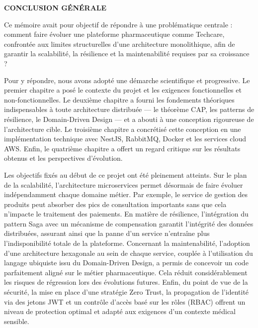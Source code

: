 \thispagestyle{normalpage}

\begin{center}
    \large \textbf{CONCLUSION GÉNÉRALE}
\end{center}
\label{page:conclusion}

\vspace{0.5cm}

Ce mémoire avait pour objectif de répondre à une problématique centrale : comment faire évoluer une plateforme pharmaceutique comme Techcare, confrontée aux limites structurelles d'une architecture monolithique, afin de garantir la scalabilité, la résilience et la maintenabilité requises par sa croissance ?

\vspace{0.3cm}

Pour y répondre, nous avons adopté une démarche scientifique et progressive. Le premier chapitre a posé le contexte du projet et les exigences fonctionnelles et non-fonctionnelles. Le deuxième chapitre a fourni les fondements théoriques indispensables à toute architecture distribuée — le théorème CAP, les patterns de résilience, le Domain-Driven Design — et a abouti à une conception rigoureuse de l'architecture cible. Le troisième chapitre a concrétisé cette conception en une implémentation technique avec NestJS, RabbitMQ, Docker et les services cloud AWS. Enfin, le quatrième chapitre a offert un regard critique sur les résultats obtenus et les perspectives d'évolution.

\vspace{0.3cm}

Les objectifs fixés au début de ce projet ont été pleinement atteints. Sur le plan de la scalabilité, l'architecture microservices permet désormais de faire évoluer indépendamment chaque domaine métier. Par exemple, le service de gestion des produits peut absorber des pics de consultation importants sans que cela n'impacte le traitement des paiements. En matière de résilience, l'intégration du pattern Saga avec un mécanisme de compensation garantit l'intégrité des données distribuées, assurant ainsi que la panne d'un service n'entraîne plus l'indisponibilité totale de la plateforme. Concernant la maintenabilité, l'adoption d'une architecture hexagonale au sein de chaque service, couplée à l'utilisation du langage ubiquiste issu du Domain-Driven Design, a permis de concevoir un code parfaitement aligné sur le métier pharmaceutique. Cela réduit considérablement les risques de régression lors des évolutions futures. Enfin, du point de vue de la sécurité, la mise en place d'une stratégie Zero Trust, la propagation de l'identité via des jetons JWT et un contrôle d'accès basé sur les rôles (RBAC) offrent un niveau de protection optimal et adapté aux exigences d'un contexte médical sensible.

